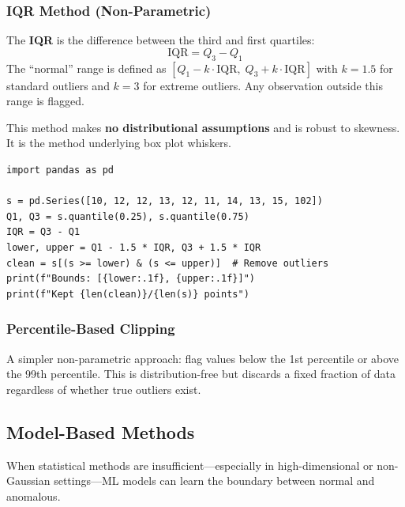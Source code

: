 \subsubsection*{IQR Method (Non-Parametric)}

\begin{definition}
The \textbf{IQR} is the difference between the third and first quartiles:
$$\text{IQR} = Q_3 - Q_1$$
The ``normal'' range is defined as $[Q_1 - k \cdot \text{IQR},\; Q_3 + k \cdot \text{IQR}]$ with $k = 1.5$ for standard outliers and $k = 3$ for extreme outliers. Any observation outside this range is flagged.
\end{definition}

This method makes \textbf{no distributional assumptions} and is robust to skewness. It is the method underlying box plot whiskers.

\begin{lstlisting}[style=pythonstyle]
import pandas as pd

s = pd.Series([10, 12, 12, 13, 12, 11, 14, 13, 15, 102])
Q1, Q3 = s.quantile(0.25), s.quantile(0.75)
IQR = Q3 - Q1
lower, upper = Q1 - 1.5 * IQR, Q3 + 1.5 * IQR
clean = s[(s >= lower) & (s <= upper)]  # Remove outliers
print(f"Bounds: [{lower:.1f}, {upper:.1f}]")
print(f"Kept {len(clean)}/{len(s)} points")
\end{lstlisting}

\subsubsection*{Percentile-Based Clipping}

A simpler non-parametric approach: flag values below the 1st percentile or above the 99th percentile. This is distribution-free but discards a fixed fraction of data regardless of whether true outliers exist.


\subsection*{Model-Based Methods}

When statistical methods are insufficient---especially in high-dimensional or non-Gaussian settings---ML models can learn the boundary between normal and anomalous.

